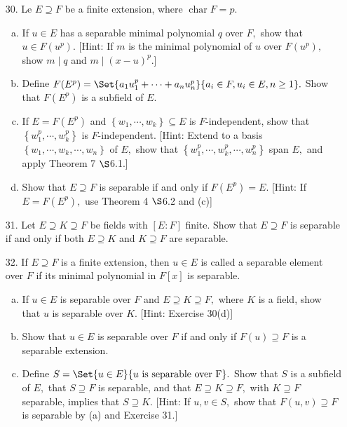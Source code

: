\documentclass{article}
\DeclareMathOperator{\cha}{char}
\begin{document}
\begin{itemize}
	\item[30.] Le $E\supseteq F$ be a finite extension, where $\cha F=p.$
		\begin{enumerate}[(a)]
			\item If $u\in E$ has a separable minimal polynomial $q$ over $F,$ show that $u\in F(u^p).$ [Hint: If $m$ is the minimal polynomial of $u$ over $F(u^p),$ show $m\mid q$ and $m\mid(x-u)^p.$]

			\item Define $F(E^p)=\Set{a_1u_1^p + \cdots + a_nu_n^p}{a_i\in F, u_i\in E, n\ge 1}.$ Show that $F(E^p)$ is a subfield of $E.$
			
			\item If $E=F(E^p)$ and $\left\{ w_1, \cdots, w_k \right\}\subseteq E$ is $F$-independent, show that $\left\{ w_1^p, \cdots, w_k^p \right\}$ is $F$-independent. [Hint: Extend to a basis $\left\{ w_1, \cdots, w_{k}, \cdots, w_n \right\}$ of $E,$ show that $\left\{ w_1^p, \cdots, w_k^p, \cdots, w_n^p \right\}$ span $E,$ and apply Theorem 7 $\S$6.1.]

			\item Show that $E\supseteq F$ is separable if and only if $F(E^p)=E.$ [Hint: If $E=F(E^p),$ use Theorem 4 $\S$6.2 and (c)]

		\end{enumerate}

	\item[31.] Let $E\supseteq K\supseteq F$ be fields with $[E:F]$ finite. Show that $E\supseteq F$ is separable if and only if both $E\supseteq K$ and $K\supseteq F$ are separable.

	\item[32.] If $E\supseteq F$ is a finite extension, then $u\in E$ is called a separable element over $F$ if its minimal polynomial in $F[x]$ is separable. 
		\begin{enumerate}[(a)]
			\item If $u\in E$ is separable over $F$ and $E\supseteq K\supseteq F,$ where $K$ is a field, show that $u$ is separable over $K.$ [Hint: Exercise 30(d)]
			
			\item Show that $u\in E$ is separable over $F$ if and only if $F(u)\supseteq F$ is a separable extension.

			\item Define $S=\Set{u\in E}{u\text{ is separable over F}}.$ Show that $S$ is a subfield of $E,$ that $S\supseteq F$ is separable, and that $E\supseteq K\supseteq F,$ with $K\supseteq F$ separable, implies that $S\supseteq K.$ [Hint: If $u, v\in S,$ show that $F(u, v)\supseteq F$ is separable by (a) and Exercise 31.]
				
		\end{enumerate}
		
\end{itemize}
\end{document}
